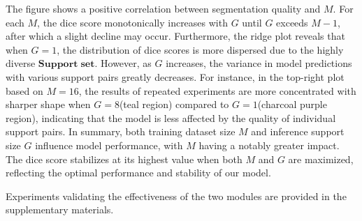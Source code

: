 The figure shows a positive correlation between segmentation quality and \( M \). For each \( M \), the dice score monotonically increases with \( G \) until \( G \) exceeds \( M-1 \), after which a slight decline may occur. Furthermore, the ridge plot reveals that when \( G=1 \), the distribution of dice scores is more dispersed due to the highly diverse \(\mathbf{Support\; set}\). However, as \( G \) increases, the variance in model predictions with various support pairs greatly decreases. For instance, in the top-right plot based on \( M=16 \), the results of repeated experiments are more concentrated with sharper shape when \( G=8 \)(teal region) compared to \( G=1 \)(charcoal purple region), indicating that the model is less affected by the quality of individual support pairs. In summary, both training dataset size \( M \) and inference support size \( G \) influence model performance, with \( M \) having a notably greater impact. The dice score stabilizes at its highest value when both \( M \) and \( G \) are maximized, reflecting the optimal performance and stability of our model.

Experiments validating the effectiveness of the two modules are provided in the supplementary materials.